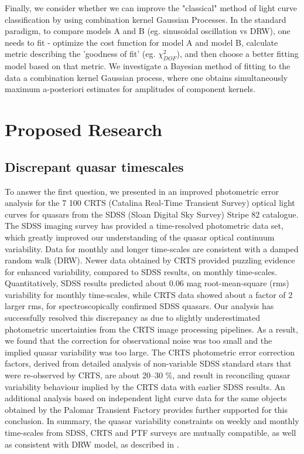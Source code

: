 \documentclass[modern]{aastex62}
\begin{document}
Finally, we consider whether we can improve the "classical" method of light curve classification by using combination kernel Gaussian Processes. In the standard paradigm,  to compare models A and B (eg. sinusoidal oscillation vs DRW), one needs to fit  - optimize the cost function for model A and model B,  calculate metric describing the 'goodness of fit' (eg. $\chi^{2}_{DOF}$), and then choose a better fitting model based on that metric. We investigate a Bayesian method of fitting to the data a combination kernel Gaussian process, where one obtains simultaneously maximum a-posteriori estimates for  amplitudes of component kernels. 

\section{Proposed Research}

\subsection{Discrepant quasar timescales}
To answer the first question, we presented in \cite{suberlak2017} an improved photometric error analysis for the 7 100 CRTS (Catalina Real-Time Transient Survey) optical light curves for quasars from the SDSS (Sloan Digital Sky Survey) Stripe 82 catalogue. The SDSS imaging survey has provided a time-resolved photometric data set, which greatly improved our understanding of the quasar optical continuum variability. Data for monthly and longer time-scales are consistent with a damped random walk (DRW). Newer data obtained by CRTS provided puzzling evidence for enhanced variability, compared to SDSS results, on monthly time-scales. Quantitatively, SDSS results predicted about 0.06 mag root-mean-square (rms) variability for monthly time-scales, while CRTS data showed about a factor of 2 larger rms, for spectroscopically confirmed SDSS quasars. Our analysis has successfully resolved this discrepancy as due to slightly underestimated photometric uncertainties from the CRTS image processing pipelines. As a result, we found that the correction for observational noise was too small and the implied quasar variability was too large. The CRTS photometric error correction factors, derived from detailed analysis of non-variable SDSS standard stars that were re-observed by CRTS, are about 20–30 \%, and result in reconciling quasar variability behaviour implied by the CRTS data with earlier SDSS results. An additional analysis based on independent light curve data for the same objects obtained by the Palomar Transient Factory provides further supported for this conclusion. In summary, the quasar variability constraints on weekly and monthly time-scales from SDSS, CRTS and PTF surveys are mutually compatible, as well as consistent with DRW model, as described in \citep{suberlak2017}. 
\end{document}
